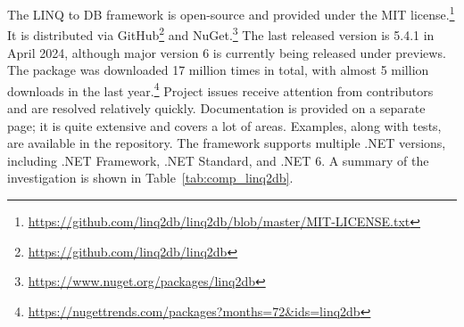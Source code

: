 The LINQ to DB framework is open-source and provided under the MIT license.\footnote{\url{https://github.com/linq2db/linq2db/blob/master/MIT-LICENSE.txt}} It is distributed via GitHub\footnote{\url{https://github.com/linq2db/linq2db}} and NuGet.\footnote{\url{https://www.nuget.org/packages/linq2db}} The last released version is 5.4.1 in April 2024, although major version 6 is currently being released under previews. The package was downloaded 17 million times in total, with almost 5 million downloads in the last year.\footnote{\url{https://nugettrends.com/packages?months=72&ids=linq2db}} Project issues receive attention from contributors and are resolved relatively quickly. Documentation is provided on a separate page; it is quite extensive and covers a lot of areas. Examples, along with tests, are available in the repository. The framework supports multiple .NET versions, including .NET Framework, .NET Standard, and .NET 6. A summary of the investigation is shown in Table~\ref{tab:comp_linq2db}.

